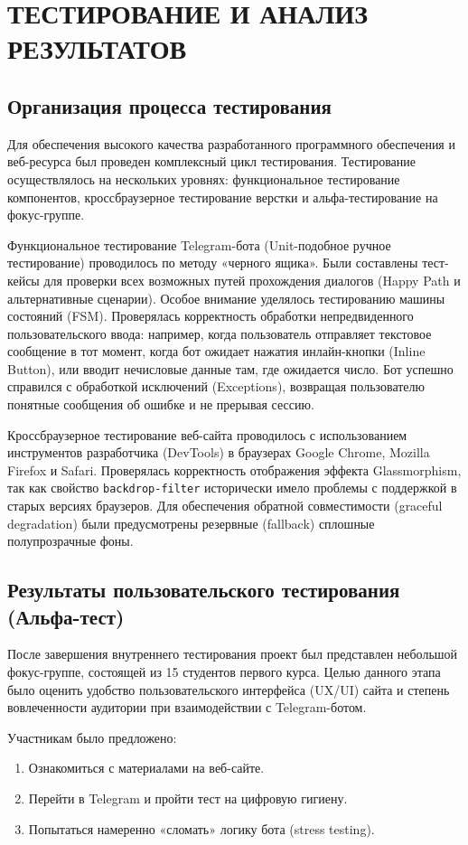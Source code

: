 \section{ТЕСТИРОВАНИЕ И АНАЛИЗ РЕЗУЛЬТАТОВ}

\subsection{Организация процесса тестирования}
Для обеспечения высокого качества разработанного программного обеспечения и веб-ресурса был проведен комплексный цикл тестирования. Тестирование осуществлялось на нескольких уровнях: функциональное тестирование компонентов, кроссбраузерное тестирование верстки и альфа-тестирование на фокус-группе.

Функциональное тестирование Telegram-бота (Unit-подобное ручное тестирование) проводилось по методу «черного ящика». Были составлены тест-кейсы для проверки всех возможных путей прохождения диалогов (Happy Path и альтернативные сценарии). Особое внимание уделялось тестированию машины состояний (FSM). Проверялась корректность обработки непредвиденного пользовательского ввода: например, когда пользователь отправляет текстовое сообщение в тот момент, когда бот ожидает нажатия инлайн-кнопки (Inline Button), или вводит нечисловые данные там, где ожидается число. Бот успешно справился с обработкой исключений (Exceptions), возвращая пользователю понятные сообщения об ошибке и не прерывая сессию.

Кроссбраузерное тестирование веб-сайта проводилось с использованием инструментов разработчика (DevTools) в браузерах Google Chrome, Mozilla Firefox и Safari. Проверялась корректность отображения эффекта Glassmorphism, так как свойство \texttt{backdrop-filter} исторически имело проблемы с поддержкой в старых версиях браузеров. Для обеспечения обратной совместимости (graceful degradation) были предусмотрены резервные (fallback) сплошные полупрозрачные фоны.

\subsection{Результаты пользовательского тестирования (Альфа-тест)}
После завершения внутреннего тестирования проект был представлен небольшой фокус-группе, состоящей из 15 студентов первого курса. Целью данного этапа было оценить удобство пользовательского интерфейса (UX/UI) сайта и степень вовлеченности аудитории при взаимодействии с Telegram-ботом.

Участникам было предложено:
\begin{enumerate}
    \item Ознакомиться с материалами на веб-сайте.
    \item Перейти в Telegram и пройти тест на цифровую гигиену.
    \item Попытаться намеренно «сломать» логику бота (stress testing).
\end{enumerate}

